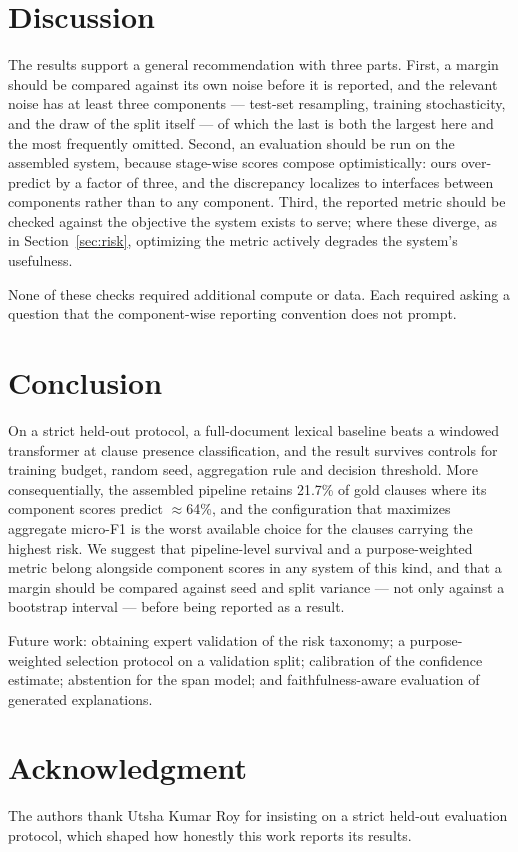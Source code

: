 \documentclass[journal,a4paper]{IEEEtran}
\begin{document}
\section{Discussion}
The results support a general recommendation with three parts. First, a margin should be compared
against its own noise before it is reported, and the relevant noise has at least three components ---
test-set resampling, training stochasticity, and the draw of the split itself --- of which the last is
both the largest here and the most frequently omitted. Second, an evaluation should be run on the
assembled system, because stage-wise scores compose optimistically: ours over-predict by a factor of
three, and the discrepancy localizes to interfaces between components rather than to any component.
Third, the reported metric should be checked against the objective the system exists to serve; where
these diverge, as in Section~\ref{sec:risk}, optimizing the metric actively degrades the system's
usefulness.

None of these checks required additional compute or data. Each required asking a question that the
component-wise reporting convention does not prompt.

\section{Conclusion}
On a strict held-out protocol, a full-document lexical baseline beats a windowed transformer at
clause presence classification, and the result survives controls for training budget, random
seed, aggregation rule and decision threshold. More consequentially, the assembled pipeline
retains 21.7\% of gold clauses where its component scores predict $\approx$64\%, and the
configuration that maximizes aggregate micro-F1 is the worst available choice for the clauses
carrying the highest risk. We suggest that pipeline-level survival and a purpose-weighted
metric belong alongside component scores in any system of this kind, and that a margin should
be compared against seed and split variance --- not only against a bootstrap interval --- before
being reported as a result.

Future work: obtaining expert validation of the risk taxonomy; a purpose-weighted selection
protocol on a validation split; calibration of the confidence estimate; abstention for the span
model; and faithfulness-aware evaluation of generated explanations.

\section*{Acknowledgment}
The authors thank Utsha Kumar Roy for insisting on a strict held-out evaluation protocol, which
shaped how honestly this work reports its results.
\end{document}
